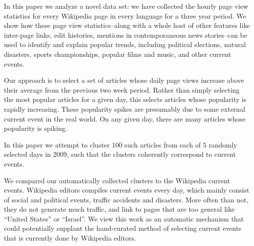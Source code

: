 \documentclass[11pt]{article}
\begin{document}





In this paper we analyze a novel data set: we have collected the hourly page view statistics for every Wikipedia page in every language for a three year period. We show how these page view statistics--along with a whole host of other features like inter-page links, edit histories, mentions in contemporaneous news stories--can be used to identify and explain popular trends, including political elections, natural disasters, sports championships, popular films and music, and other current events.

Our approach is to select a set of articles whose daily page views increase above their average from the previous two week period. Rather than simply selecting the most popular articles for a given day, this selects articles whose popularity is rapidly increasing. These popularity spikes are presumably due to some external current event in the real world. On any given day, there are many articles whose popularity is spiking.

In this paper we attempt to cluster 100 such articles from each of 5 randomly selected days in 2009, such that the clusters coherently correspond to current events.

We compared our automatically collected clusters to the Wikipedia current events. Wikipedia editors compiles current events every day, which mainly consist of social and political events, traffic accidents and disasters. More often than not, they do not generate much traffic, and link to pages that are too general like ``United States'' or ``Israel''. We view this work as an automatic mechanism that could potentially supplant the hand-curated method of selecting current events that is currently done by Wikipedia editors.
\end{document}
